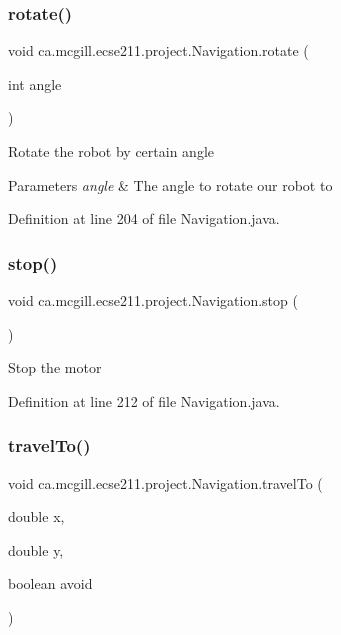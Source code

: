 \subsubsection{\texorpdfstring{rotate()}{rotate()}}
{\footnotesize\ttfamily void ca.\+mcgill.\+ecse211.\+project.\+Navigation.\+rotate (\begin{DoxyParamCaption}\item[{int}]{angle }\end{DoxyParamCaption})}

Rotate the robot by certain angle


\begin{DoxyParams}{Parameters}
{\em angle} & The angle to rotate our robot to \\
\hline
\end{DoxyParams}


Definition at line 204 of file Navigation.\+java.

\mbox{\label{classca_1_1mcgill_1_1ecse211_1_1project_1_1_navigation_ae8530d181ffd790ff9dea5eeab54b1a1}} 
\subsubsection{\texorpdfstring{stop()}{stop()}}
{\footnotesize\ttfamily void ca.\+mcgill.\+ecse211.\+project.\+Navigation.\+stop (\begin{DoxyParamCaption}{ }\end{DoxyParamCaption})}

Stop the motor 

Definition at line 212 of file Navigation.\+java.

\mbox{\label{classca_1_1mcgill_1_1ecse211_1_1project_1_1_navigation_ada8a324c1d391698164476d4d728f0c4}} 
\subsubsection{\texorpdfstring{travel\+To()}{travelTo()}}
{\footnotesize\ttfamily void ca.\+mcgill.\+ecse211.\+project.\+Navigation.\+travel\+To (\begin{DoxyParamCaption}\item[{double}]{x,  }\item[{double}]{y,  }\item[{boolean}]{avoid }\end{DoxyParamCaption})}

